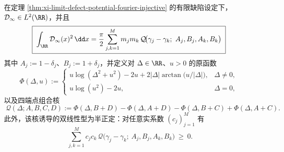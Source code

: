 \begin{theorem}\label{thm:xi-limit-defect-potential-L2-energy-kernel}
在定理 \ref{thm:xi-limit-defect-potential-fourier-injective} 的有限缺陷设定下，\(\mathcal{D}_\infty\in L^2(\RR)\)，并且
\begin{equation}\label{eq:xi-limit-defect-L2-energy-closed}
\boxed{\;
\int_{\RR}\mathcal{D}_\infty(x)^2\,\dd x
=\frac{\pi}{2}\sum_{j,k=1}^{M}m_jm_k\,\mathcal{Q}\!\bigl(\gamma_j-\gamma_k;\ A_j,B_j,A_k,B_k\bigr)\;}
\end{equation}
其中
\(
A_j:=1-\delta_j
\)、\(
B_j:=1+\delta_j
\)，并定义对 \(\Delta\in\RR\)、\(u>0\) 的原函数
\[
\Phi(\Delta,u):=
\begin{cases}
u\log(\Delta^2+u^2)-2u+2|\Delta|\arctan\!\bigl(u/|\Delta|\bigr),&\Delta\ne 0,\\[2mm]
u\log(u^2)-2u,&\Delta=0,
\end{cases}
\]
以及四端点组合核
\begin{equation}\label{eq:xi-limit-defect-L2-energy-kernel-Q}
\boxed{\;
\mathcal{Q}(\Delta;A,B,C,D)
:=\Phi(\Delta,B+D)-\Phi(\Delta,A+D)-\Phi(\Delta,B+C)+\Phi(\Delta,A+C).}
\end{equation}
此外，该核诱导的双线性型为半正定：对任意实系数 \((c_j)_{j=1}^{M}\) 有
\begin{equation}\label{eq:xi-limit-defect-L2-energy-kernel-psd}
\boxed{\;
\sum_{j,k=1}^{M}c_jc_k\,\mathcal{Q}\!\bigl(\gamma_j-\gamma_k;\ A_j,B_j,A_k,B_k\bigr)\ \ge\ 0.}
\end{equation}
\end{theorem}
